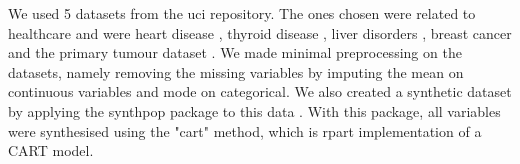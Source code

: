 We used 5 datasets from the \ac{uci} repository. The ones chosen were related to healthcare and were heart disease \cite{misc_heart_disease_45}, thyroid disease \cite{misc_thyroid_disease_102}, liver disorders \cite{misc_liver_disorders_60}, breast cancer \cite{misc_breast_cancer_wisconsin_diagnostic_17} and the primary tumour dataset \cite{misc_primary_tumor_83}. We made minimal preprocessing on the datasets, namely removing the missing variables by imputing the mean on continuous variables and mode on categorical.
We also created a synthetic dataset by applying the synthpop package to this data \cite{synthpop}. With this package, all variables were synthesised using the "cart" method, which is rpart implementation of a CART model.

